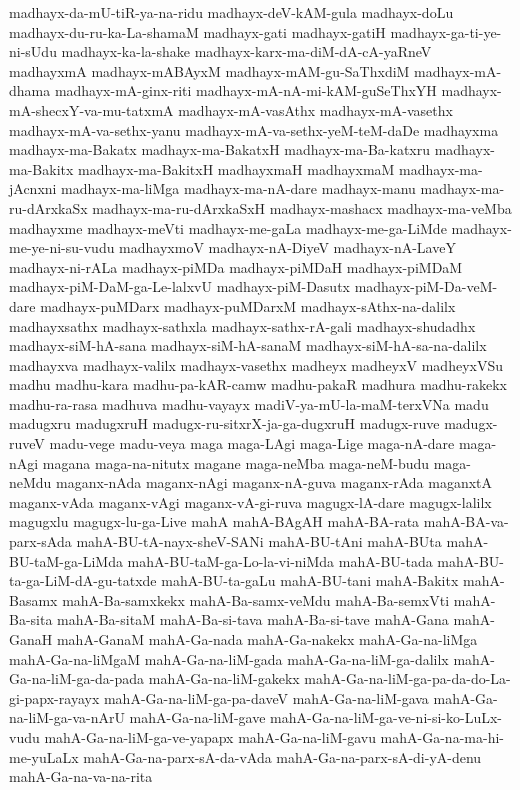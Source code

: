 {madhayx-da-mU-tiR-ya-na-ridu
madhayx-deV-kAM-gula
madhayx-doLu
madhayx-du-ru-ka-La-shamaM
madhayx-gati
madhayx-gatiH
madhayx-ga-ti-ye-ni-sUdu
madhayx-ka-la-shake
madhayx-karx-ma-diM-dA-cA-yaRneV
madhayxmA
madhayx-mABAyxM
madhayx-mAM-gu-SaThxdiM
madhayx-mA-dhama
madhayx-mA-ginx-riti
madhayx-mA-nA-mi-kAM-guSeThxYH
madhayx-mA-shecxY-va-mu-tatxmA
madhayx-mA-vasAthx
madhayx-mA-vasethx
madhayx-mA-va-sethx-yanu
madhayx-mA-va-sethx-yeM-teM-daDe
madhayxma
madhayx-ma-Bakatx
madhayx-ma-BakatxH
madhayx-ma-Ba-katxru
madhayx-ma-Bakitx
madhayx-ma-BakitxH
madhayxmaH
madhayxmaM
madhayx-ma-jAcnxni
madhayx-ma-liMga
madhayx-ma-nA-dare
madhayx-manu
madhayx-ma-ru-dArxkaSx
madhayx-ma-ru-dArxkaSxH
madhayx-mashacx
madhayx-ma-veMba
madhayxme
madhayx-meVti
madhayx-me-gaLa
madhayx-me-ga-LiMde
madhayx-me-ye-ni-su-vudu
madhayxmoV
madhayx-nA-DiyeV
madhayx-nA-LaveY
madhayx-ni-rALa
madhayx-piMDa
madhayx-piMDaH
madhayx-piMDaM
madhayx-piM-DaM-ga-Le-lalxvU
madhayx-piM-Dasutx
madhayx-piM-Da-veM-dare
madhayx-puMDarx
madhayx-puMDarxM
madhayx-sAthx-na-dalilx
madhayxsathx
madhayx-sathxla
madhayx-sathx-rA-gali
madhayx-shudadhx
madhayx-siM-hA-sana
madhayx-siM-hA-sanaM
madhayx-siM-hA-sa-na-dalilx
madhayxva
madhayx-valilx
madhayx-vasethx
madheyx
madheyxV
madheyxVSu
madhu
madhu-kara
madhu-pa-kAR-camw
madhu-pakaR
madhura
madhu-rakekx
madhu-ra-rasa
madhuva
madhu-vayayx
madiV-ya-mU-la-maM-terxVNa
madu
madugxru
madugxruH
madugx-ru-sitxrX-ja-ga-dugxruH
madugx-ruve
madugx-ruveV
madu-vege
madu-veya
maga
maga-LAgi
maga-Lige
maga-nA-dare
maga-nAgi
magana
maga-na-nitutx
magane
maga-neMba
maga-neM-budu
maga-neMdu
maganx-nAda
maganx-nAgi
maganx-nA-guva
maganx-rAda
maganxtA
maganx-vAda
maganx-vAgi
maganx-vA-gi-ruva
magugx-lA-dare
magugx-lalilx
magugxlu
magugx-lu-ga-Live
mahA
mahA-BAgAH
mahA-BA-rata
mahA-BA-va-parx-sAda
mahA-BU-tA-nayx-sheV-SANi
mahA-BU-tAni
mahA-BUta
mahA-BU-taM-ga-LiMda
mahA-BU-taM-ga-Lo-la-vi-niMda
mahA-BU-tada
mahA-BU-ta-ga-LiM-dA-gu-tatxde
mahA-BU-ta-gaLu
mahA-BU-tani
mahA-Bakitx
mahA-Basamx
mahA-Ba-samxkekx
mahA-Ba-samx-veMdu
mahA-Ba-semxVti
mahA-Ba-sita
mahA-Ba-sitaM
mahA-Ba-si-tava
mahA-Ba-si-tave
mahA-Gana
mahA-GanaH
mahA-GanaM
mahA-Ga-nada
mahA-Ga-nakekx
mahA-Ga-na-liMga
mahA-Ga-na-liMgaM
mahA-Ga-na-liM-gada
mahA-Ga-na-liM-ga-dalilx
mahA-Ga-na-liM-ga-da-pada
mahA-Ga-na-liM-gakekx
mahA-Ga-na-liM-ga-pa-da-do-La-gi-papx-rayayx
mahA-Ga-na-liM-ga-pa-daveV
mahA-Ga-na-liM-gava
mahA-Ga-na-liM-ga-va-nArU
mahA-Ga-na-liM-gave
mahA-Ga-na-liM-ga-ve-ni-si-ko-LuLx-vudu
mahA-Ga-na-liM-ga-ve-yapapx
mahA-Ga-na-liM-gavu
mahA-Ga-na-ma-hi-me-yuLaLx
mahA-Ga-na-parx-sA-da-vAda
mahA-Ga-na-parx-sA-di-yA-denu
mahA-Ga-na-va-na-rita
}
